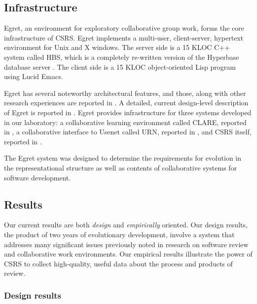 \subsection*{Infrastructure}
\label{sec:infrastructure}

Egret, an environment for exploratory collaborative group work, forms the
core infrastructure of CSRS. Egret implements a multi-user, client-server,
hypertext environment for Unix and X windows.  The server side is a 15 KLOC
C++ system called HBS, which is a completely re-written version of the
Hyperbase database server \cite{Wiil90}. The client side is a 15 KLOC
object-oriented Lisp program using Lucid Emacs.

Egret has several noteworthy architectural features, and those, along with
other research experiences are reported in
\cite{csdl-91-03,csdl-92-01,csdl-92-08,csdl-93-09}.  A detailed, current
design-level description of Egret is reported in \cite{csdl-91-02}.  Egret
provides infrastructure for three systems developed in our laboratory: a
collaborative learning environment called CLARE, reported in
\cite{csdl-92-03,csdl-93-14}, a collaborative interface to Usenet called
URN, reported in \cite{csdl-93-06}, and CSRS itself, reported in
\cite{csdl-92-04,csdl-92-07,csdl-93-07,csdl-93-17}.

The Egret system was designed to determine the requirements for evolution
in the representational structure as well as contents of collaborative
systems for software development.  

\subsection{Results}
\label{sec:results}

Our current results are both {\em design}\/ and {\em empirically}\/
oriented.  Our design results, the product of two years of evolutionary
development, involve a system that addresses many significant issues
previously noted in research on software review and collaborative work
environments.  Our empirical results illustrate the power of CSRS to
collect high-quality, useful data about the process and products of review.

\subsubsection{Design results} 

